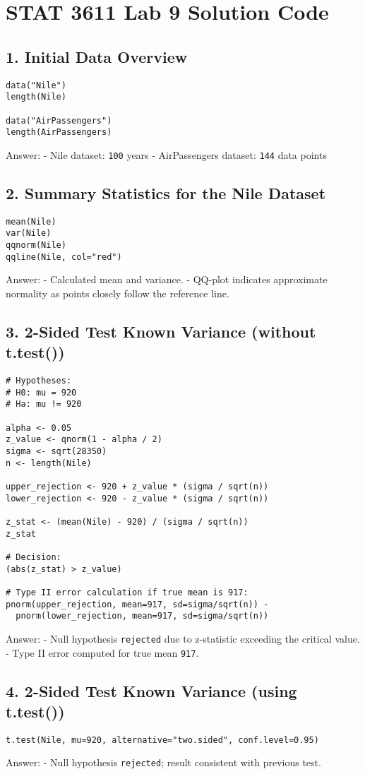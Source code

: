 \documentclass{article}
\begin{document}
\section*{STAT 3611 Lab 9 Solution Code}

\subsection*{1. Initial Data Overview}
\begin{lstlisting}
data("Nile")
length(Nile)

data("AirPassengers")
length(AirPassengers)
\end{lstlisting}
Answer:
- Nile dataset: \texttt{100} years
- AirPassengers dataset: \texttt{144} data points

\subsection*{2. Summary Statistics for the Nile Dataset}
\begin{lstlisting}
mean(Nile)
var(Nile)
qqnorm(Nile)
qqline(Nile, col="red")
\end{lstlisting}
Answer:
- Calculated mean and variance.
- QQ-plot indicates approximate normality as points closely follow the reference line.

\subsection*{3. 2-Sided Test Known Variance (without t.test())}
\begin{lstlisting}
# Hypotheses:
# H0: mu = 920
# Ha: mu != 920

alpha <- 0.05
z_value <- qnorm(1 - alpha / 2)
sigma <- sqrt(28350)
n <- length(Nile)

upper_rejection <- 920 + z_value * (sigma / sqrt(n))
lower_rejection <- 920 - z_value * (sigma / sqrt(n))

z_stat <- (mean(Nile) - 920) / (sigma / sqrt(n))
z_stat

# Decision:
(abs(z_stat) > z_value)

# Type II error calculation if true mean is 917:
pnorm(upper_rejection, mean=917, sd=sigma/sqrt(n)) - 
  pnorm(lower_rejection, mean=917, sd=sigma/sqrt(n))
\end{lstlisting}
Answer:
- Null hypothesis \texttt{rejected} due to z-statistic exceeding the critical value.
- Type II error computed for true mean \texttt{917}.

\subsection*{4. 2-Sided Test Known Variance (using t.test())}
\begin{lstlisting}
t.test(Nile, mu=920, alternative="two.sided", conf.level=0.95)
\end{lstlisting}
Answer:
- Null hypothesis \texttt{rejected}; result consistent with previous test.
\end{document}
